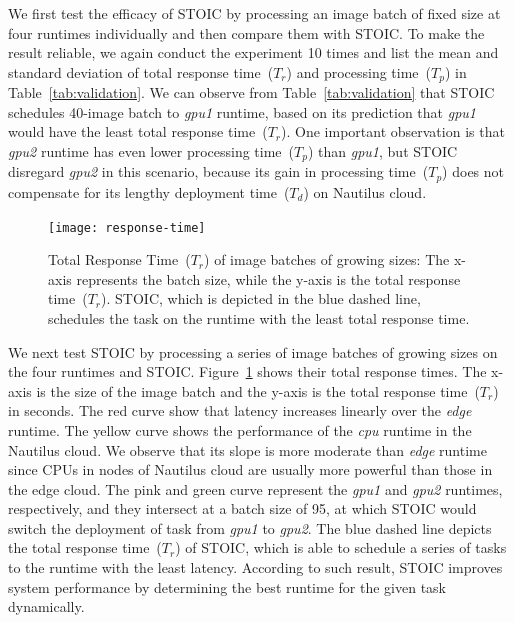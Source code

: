 We first test the efficacy of STOIC by processing an image batch of fixed size at four runtimes individually and then compare them with STOIC. To make the result reliable, we again conduct the experiment 10 times and list the mean and standard deviation of total response time~($T_r$) and processing time~($T_p$) in Table~\ref{tab:validation}. We can observe from Table~\ref{tab:validation} that STOIC schedules 40-image batch to \textit{gpu1} runtime, based on its prediction that  \textit{gpu1} would have the least total response time~($T_r$). One important observation is that \textit{gpu2} runtime has even lower processing time~($T_p$) than \textit{gpu1}, but STOIC disregard \textit{gpu2} in this scenario, because its gain in processing time~($T_p$) does not compensate for its lengthy deployment time~($T_d$) on Nautilus cloud.

\begin{figure}[t] \centering 
\texttt{[image: response-time]}
\caption{Total Response Time~($T_r$) of image batches of growing sizes: The x-axis represents the batch size, while the y-axis is the total response time~($T_r$). STOIC, which is depicted in the blue dashed line, schedules the task on the runtime with the least total response time.  
\label{fig:response-time}}
\end{figure}

We next test STOIC by processing a series of image batches of growing sizes on the four runtimes and STOIC. Figure~\ref{fig:response-time} shows their total response times. The x-axis is the size of the image batch and the y-axis is the total response time~($T_r$) in seconds. The red curve show that latency
increases linearly over the \textit{edge} runtime.  The yellow curve 
shows the performance of the \textit{cpu} runtime in the Nautilus cloud. 
We observe that its slope is more moderate than \textit{edge} runtime since CPUs in nodes of Nautilus cloud are usually more powerful than those in the edge cloud. The pink and green curve represent the \textit{gpu1} and \textit{gpu2} runtimes, respectively, and they intersect at a batch size of 95, at which STOIC would switch the deployment of task from \textit{gpu1} to \textit{gpu2}. The blue dashed line depicts the total response time~($T_r$) of STOIC, which is able to schedule a series of tasks to the runtime with the least latency. According to such result, STOIC improves system performance by determining the best runtime
for the given task dynamically.




